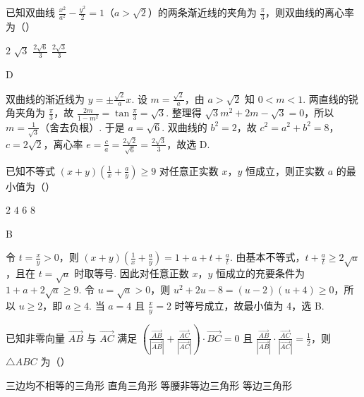 \begin{problem}
已知双曲线 \(\frac{x^2}{a^2} - \frac{y^2}{2} = 1\)（\(a > \sqrt{2}\)）的两条渐近线的夹角为 \(\frac{\pi}{3}\)，则双曲线的离心率为（\quad）

\choices
    {\(2\)}
    {\(\sqrt{3}\)}
    {\(\frac{2\sqrt{6}}{3}\)}
    {\(\frac{2\sqrt{3}}{3}\)}
\end{problem}

\begin{answer}
D
\end{answer}

\begin{solution}
双曲线的渐近线为 \(y=\pm\frac{\sqrt2}{a}x\). 设 \(m=\frac{\sqrt2}{a}\)，由 \(a>\sqrt2\) 知 \(0<m<1\). 两直线的锐角夹角为 \(\frac\pi3\)，故 \(\frac{2m}{1-m^2}=\tan\frac\pi3=\sqrt3\). 整理得 \(\sqrt3m^2+2m-\sqrt3=0\)，所以 \(m=\frac1{\sqrt3}\)（舍去负根）. 于是 \(a=\sqrt6\). 双曲线的 \(b^2=2\)，故 \(c^2=a^2+b^2=8\)，\(c=2\sqrt2\)，离心率 \(e=\frac ca=\frac{2\sqrt2}{\sqrt6}=\frac{2\sqrt3}{3}\)，故选 D.
\end{solution}

\begin{problem}
已知不等式 \((x + y)\left(\frac{1}{x} + \frac{a}{y}\right) \geqslant 9\) 对任意正实数 \(x\)，\(y\) 恒成立，则正实数 \(a\) 的最小值为（\quad）

\choices
    {\(2\)}
    {\(4\)}
    {\(6\)}
    {\(8\)}
\end{problem}

\begin{answer}
B
\end{answer}

\begin{solution}
令 \(t=\frac{x}{y}>0\)，则 \((x+y)\left(\frac1x+\frac ay\right)=1+a+t+\frac at\). 由基本不等式，\(t+\frac at\geqslant2\sqrt a\)，且在 \(t=\sqrt a\) 时取等号. 因此对任意正数 \(x\)，\(y\) 恒成立的充要条件为 \(1+a+2\sqrt a\geqslant9\). 令 \(u=\sqrt a>0\)，则 \(u^2+2u-8=(u-2)(u+4)\geqslant0\)，所以 \(u\geqslant2\)，即 \(a\geqslant4\). 当 \(a=4\) 且 \(\frac{x}{y}=2\) 时等号成立，故最小值为 4，选 B.
\end{solution}

\begin{problem}
已知非零向量 \(\overrightarrow{AB}\) 与 \(\overrightarrow{AC}\) 满足 \(\left(\frac{\overrightarrow{AB}}{|\overrightarrow{AB}|} + \frac{\overrightarrow{AC}}{|\overrightarrow{AC}|}\right)\cdot \overrightarrow{BC} = 0\) 且 \(\frac{\overrightarrow{AB}}{|\overrightarrow{AB}|}\cdot \frac{\overrightarrow{AC}}{|\overrightarrow{AC}|} = \frac{1}{2}\)，则 \(\triangle ABC\) 为（\quad）

\choices
    {三边均不相等的三角形}
    {直角三角形}
    {等腰非等边三角形}
    {等边三角形}
\end{problem}

